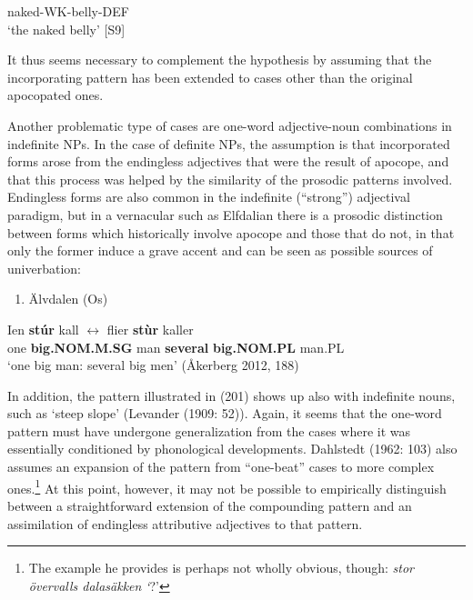 naked-WK-belly-DEF\\ %


‘the naked belly’ [S9]
\z

It thus seems necessary to complement the hypothesis by assuming that the incorporating pattern has been extended to cases other than the original apocopated ones.

Another problematic type of cases are one-word adjective-noun combinations in indefinite NPs. In the case of definite NPs, the assumption is that incorporated forms arose from the endingless adjectives that were the result of apocope, and that this process was helped by the similarity of the prosodic patterns involved. Endingless forms are also common in the indefinite (“strong”) adjectival paradigm, but in a vernacular such as Elfdalian there is a prosodic distinction between forms which historically involve apocope and those that do not, in that only the former induce a grave accent and can be seen as possible sources of univerbation:

\begin{enumerate} %
\item 
Älvdalen (Os) 

\end{enumerate} %
\ea\label{}
\gll Ien  \textbf{stúr} kall   \textbf{$\leftrightarrow $} flier\textbf{  stùr} kaller\\


one  \textbf{big.NOM.M.SG} man   \textbf{several} \textbf{big.NOM.PL} man.PL\\ %


‘one big man: several big men’ (Åkerberg 2012, 188)
\z


In addition, the pattern illustrated in (201) shows up also with indefinite nouns, such as  ‘steep slope’ (Levander (1909: 52)). Again, it seems that the one-word pattern must have undergone generalization from the cases where it was essentially conditioned by phonological developments. Dahlstedt (1962: 103) also assumes an expansion of the pattern from “one-beat” cases to more complex ones.\footnote{ The example he provides is perhaps not wholly obvious, though: \textit{stor övervalls dalasäkken }\textit{‘}?’} At this point, however, it may not be possible to empirically distinguish between a straightforward extension of the compounding pattern and an assimilation of endingless attributive adjectives to that pattern. 

